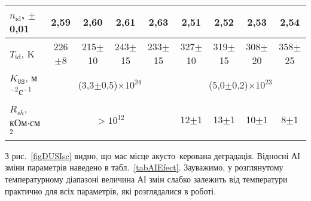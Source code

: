 \begin{table}
\begin{tabular}{|l|c|c|c|c|c|c|c|c|}
$n_\mathrm{id}$, $\pm$0,01&2,59&2,60&2,61&2,63&2,51&2,52&2,53&2,54\\ \hline
$T_\mathrm{id}$, K&226$\pm$8&215$\pm$10&243$\pm$15&233$\pm$15&327$\pm$10&319$\pm$15&308$\pm$20&358$\pm$25\\ \hline
$K_\mathtt{US}$, м$^{-2}$с$^{-1}$&\multicolumn{4}{c|}{(3,3$\pm$0,5)$\times10^{24}$}&\multicolumn{4}{c|}{(5,0$\pm$0,2)$\times10^{23}$}\\ \hline
$R_{sh}$, кОм$\cdot$см$^2$&\multicolumn{4}{c|}{$>10^{12}$}
&12$\pm$1&13$\pm$1&10$\pm$1&8$\pm$1\\ \hline
\end{tabular}
\end{table}

З рис.~\ref{figDUSIsc} видно, що має місце акусто--керована деградація.
Відносні АІ зміни  параметрів наведено в табл.~\ref{tabAIEfect}.
Зауважимо, у розглянутому температурному діапазоні величина АІ змін слабко залежить від температури практично для всіх параметрів, які розглядалися в роботі.


